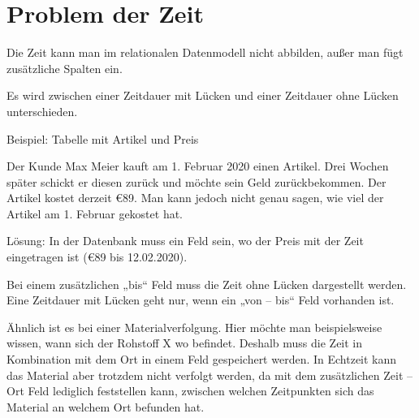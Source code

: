 \section{Problem der Zeit}

Die Zeit kann man im relationalen Datenmodell nicht abbilden, außer man fügt zusätzliche Spalten ein. 

Es wird zwischen einer Zeitdauer mit Lücken und einer Zeitdauer ohne Lücken unterschieden. 

Beispiel: Tabelle mit Artikel und Preis

Der Kunde Max Meier kauft am 1. Februar 2020 einen Artikel. Drei Wochen später schickt er diesen zurück und möchte sein Geld zurückbekommen. Der Artikel kostet derzeit \euro{89}. Man kann jedoch nicht genau sagen, wie viel der Artikel am 1. Februar gekostet hat.

Lösung: In der Datenbank muss ein Feld sein, wo der Preis mit der Zeit eingetragen ist (\euro{89} bis 12.02.2020).

Bei einem zusätzlichen „bis“ Feld muss die Zeit ohne Lücken dargestellt werden. Eine Zeitdauer mit Lücken geht nur, wenn ein „von – bis“ Feld vorhanden ist.

Ähnlich ist es bei einer Materialverfolgung. Hier möchte man beispielsweise wissen, wann sich der Rohstoff X wo befindet. Deshalb muss die Zeit in Kombination mit dem Ort in einem Feld gespeichert werden. In Echtzeit kann das Material aber trotzdem nicht verfolgt werden, da mit dem zusätzlichen Zeit – Ort Feld lediglich feststellen kann, zwischen welchen Zeitpunkten sich das Material an welchem Ort befunden hat.
